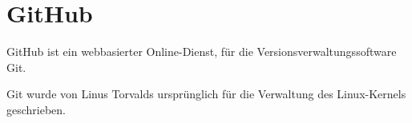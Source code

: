 \section{GitHub}
GitHub ist ein webbasierter Online-Dienst, für die Versionsverwaltungssoftware Git.

Git wurde von Linus Torvalds ursprünglich für die Verwaltung des Linux-Kernels geschrieben.

